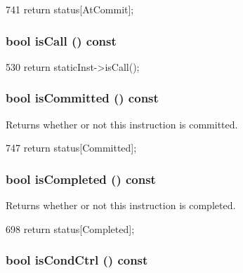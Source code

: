 \begin{DoxyCode}
741 { return status[AtCommit]; }
\end{DoxyCode}
\hypertarget{classBaseDynInst_aa2317a020504e552097abb001847f74c}{
\subsubsection[{isCall}]{\setlength{\rightskip}{0pt plus 5cm}bool isCall () const}}
\label{classBaseDynInst_aa2317a020504e552097abb001847f74c}



\begin{DoxyCode}
530 { return staticInst->isCall(); }
\end{DoxyCode}
\hypertarget{classBaseDynInst_a9cc760f9838c39bfb3112cdbfb468cf3}{
\subsubsection[{isCommitted}]{\setlength{\rightskip}{0pt plus 5cm}bool isCommitted () const}}
\label{classBaseDynInst_a9cc760f9838c39bfb3112cdbfb468cf3}
Returns whether or not this instruction is committed. 


\begin{DoxyCode}
747 { return status[Committed]; }
\end{DoxyCode}
\hypertarget{classBaseDynInst_a9065f06f69273b51a799acff12d2c4c7}{
\subsubsection[{isCompleted}]{\setlength{\rightskip}{0pt plus 5cm}bool isCompleted () const}}
\label{classBaseDynInst_a9065f06f69273b51a799acff12d2c4c7}
Returns whether or not this instruction is completed. 


\begin{DoxyCode}
698 { return status[Completed]; }
\end{DoxyCode}
\hypertarget{classBaseDynInst_a941920262acf4437e241c7600b3007ff}{
\subsubsection[{isCondCtrl}]{\setlength{\rightskip}{0pt plus 5cm}bool isCondCtrl () const}}
\label{classBaseDynInst_a941920262acf4437e241c7600b3007ff}



